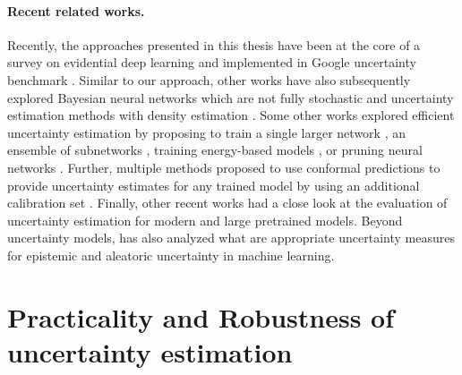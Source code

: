 \paragraph{Recent related works.} Recently, the approaches presented in this thesis have been  at the core of a survey on evidential deep learning \cite{survey_evidential_uncertainty} and implemented in Google uncertainty benchmark \cite{nado2021uncertainty}. Similar to our approach, other works have also subsequently explored Bayesian neural networks which are not fully stochastic \cite{bnnfullystochastic2022sharma} and uncertainty estimation methods with density estimation \cite{du2022vos, postels2020hiddenuncertainty, uncertainty-generative-classifier}. Some other works explored efficient uncertainty estimation by proposing to train a single larger network \cite{abe2022deep}, an ensemble of subnetworks \cite{mimo-independent-subnetworks}, training energy-based models \cite{ood_ebm}, or pruning neural networks \cite{ayle2022robustness-sparse}. Further, multiple methods proposed to use conformal predictions to provide uncertainty estimates for any trained model by using an additional calibration set \cite{conformal-survey, Park2020PAC}. Finally, other recent works \cite{minderer2021revisiting, tran2022plex} had a close look at the evaluation of uncertainty estimation for modern and large pretrained models. Beyond uncertainty models, \cite{hullermeier2022quantifying} has also analyzed what are appropriate uncertainty measures for epistemic and aleatoric uncertainty in machine learning. 


\section{Practicality and Robustness of uncertainty estimation} 

